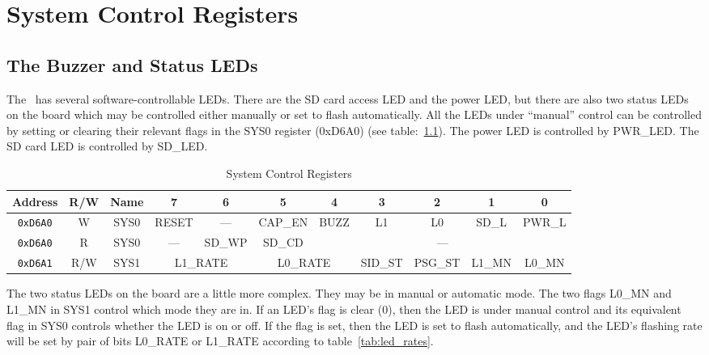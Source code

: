 \chapter{System Control Registers}
\label{sec:sysctrl}

\section*{The Buzzer and Status LEDs}

The \jr\ has several software-controllable LEDs. There are the SD card access LED and the power LED, but there are also two status LEDs on the board which may be controlled either manually or set to flash automatically. All the LEDs under ``manual'' control can be controlled by setting or clearing their relevant flags in the SYS0 register (0xD6A0) (see table:~\ref{tab:sys_ctrl_reg}). The power LED is controlled by PWR\_LED. The SD card LED is controlled by SD\_LED.

\begin{table}[ht]
    \begin{center}
        \begin{tabular}{|c|c|c|c|c|c|c|c|c|c|c|} \hline
            Address & R/W & Name & 7 & 6 & 5 & 4 & 3 & 2 & 1 & 0 \\\hline\hline

            \verb+0xD6A0+ & W & SYS0 & RESET & --- & CAP\_EN & BUZZ & L1 & L0 & SD\_L & PWR\_L \\ \hline
            \verb+0xD6A0+ & R & SYS0 & --- & SD\_WP & SD\_CD & \multicolumn{5}{|c|}{---} \\ \hline
            \verb+0xD6A1+ & R/W & SYS1 & \multicolumn{2}{|c|}{L1\_RATE}
                                       & \multicolumn{2}{|c|}{L0\_RATE}
                                       & SID\_ST
                                       & PSG\_ST
                                       & L1\_MN & L0\_MN \\ \hline
        \end{tabular}
    \end{center}
    \caption{System Control Registers}
    \label{tab:sys_ctrl_reg}
\end{table}

The two status LEDs on the board are a little more complex. They may be in manual or automatic mode. The two flags L0\_MN and L1\_MN in SYS1 control which mode they are in. If an LED's flag is clear (0), then the LED is under manual control and its equivalent flag in SYS0 controls whether the LED is on or off. If the flag is set, then the LED is set to flash automatically, and the LED's flashing rate will be set by pair of bits L0\_RATE or L1\_RATE according to table~\ref{tab:led_rates}.


